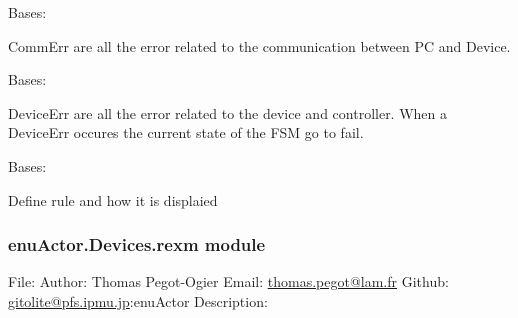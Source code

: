\documentclass[letterpaper,10pt,english]{sphinxmanual}
\begin{document}
\begin{fulllineitems}
\label{enuActor.Devices:enuActor.Devices.Error.CommErr}
Bases: {\hyperref[enuActor.Devices:enuActor.Devices.Error.RuleError]{}}

CommErr are all the error related to the communication
between PC and Device.

\end{fulllineitems}


\begin{fulllineitems}
\label{enuActor.Devices:enuActor.Devices.Error.DeviceErr}
Bases: {\hyperref[enuActor.Devices:enuActor.Devices.Error.RuleError]{}}

DeviceErr are all the error related to the device and controller.
When a DeviceErr occures the current state of the FSM go to fail.

\end{fulllineitems}


\begin{fulllineitems}
\label{enuActor.Devices:enuActor.Devices.Error.RuleError}
Bases: 

Define rule and how it is displaied

\begin{fulllineitems}
\label{enuActor.Devices:enuActor.Devices.Error.RuleError.PRIORITY_DEFAULT}
\end{fulllineitems}


\end{fulllineitems}



\subsubsection{enuActor.Devices.rexm module}
\label{enuActor.Devices:module-enuActor.Devices.rexm}\label{enuActor.Devices:enuactor-devices-rexm-module}
File:
Author: Thomas Pegot-Ogier
Email: \href{mailto:thomas.pegot@lam.fr}{thomas.pegot@lam.fr}
Github: \href{mailto:gitolite@pfs.ipmu.jp}{gitolite@pfs.ipmu.jp}:enuActor
Description:
\end{document}
